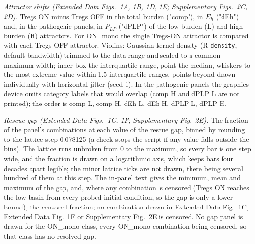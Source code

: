 \documentclass[11pt]{article}
\begin{document}
\emph{Attractor shifts (Extended Data Figs.~1A, 1B, 1D, 1E; Supplementary Figs.~2C, 2D).} Tregs ON minus Tregs OFF in the total burden ("comp"), in
$E_h$ ("dEh") and, in the pathogenic panels, in $P_{LP}$ ("dPLP") of the low-burden (L) and
high-burden (H) attractors. For ON\_mono the single Tregs-ON attractor is compared with
each Tregs-OFF attractor. Violins: Gaussian kernel density (R \texttt{density}, default
bandwidth) trimmed to the data range and scaled to a common maximum width; inner box the
interquartile range, point the median, whiskers to the most extreme value within 1.5
interquartile ranges, points beyond drawn individually with horizontal jitter (seed 1).
In the pathogenic panels the graphics device omits category labels that would overlap
(comp H and dPLP L are not printed); the order is comp L, comp H, dEh L, dEh H, dPLP L,
dPLP H.

\emph{Rescue gap (Extended Data Figs.~1C, 1F; Supplementary Fig.~2E).} The fraction of the panel's combinations at each value of the
rescue gap, binned by rounding to the lattice step 0.078125 (a check stops the script if
any value falls outside the bins). The lattice runs unbroken from 0 to the maximum, so every bar is one step wide, and the
fraction is drawn on a logarithmic axis, which keeps bars four decades apart legible; the
minor lattice ticks are not drawn, there being several hundred of them at this step. The
in-panel text gives the minimum, mean and maximum of the gap, and, where any combination
is censored (Tregs ON reaches the low basin from every probed initial condition, so the
gap is only a lower bound), the censored fraction; no combination drawn in Extended Data Fig.~1C,
Extended Data Fig.~1F or Supplementary Fig.~2E is censored. No gap panel is drawn for the ON\_mono class, every
ON\_mono combination being censored, so that class has no resolved gap.
\end{document}
